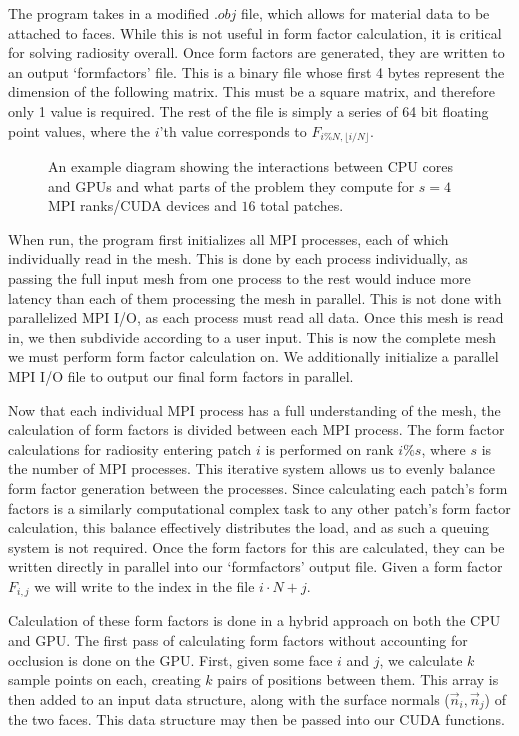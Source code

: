 \documentclass[conference]{IEEEtran}
\begin{document}
The program takes in a modified $.obj$ file, which allows for material data to be attached to faces. While this is not useful in form factor calculation, it is critical for solving radiosity overall. Once form factors are generated, they are written to an output `formfactors' file. This is a binary file whose first 4 bytes represent the dimension of the following matrix. This must be a square matrix, and therefore only 1 value is required. The rest of the file is simply a series of 64 bit floating point values, where the $i$'th value corresponds to $F_{i\%N, \lfloor i/N\rfloor}$.

\begin{figure}

\caption{An example diagram showing the interactions between CPU cores and GPUs and what parts of the problem they compute for $s=4$ MPI ranks/CUDA devices and $16$ total patches.}
\label{fig:division}
\end{figure}

When run, the program first initializes all MPI processes, each of which individually read in the mesh. This is done by each process individually, as passing the full input mesh from one process to the rest would induce more latency than each of them processing the mesh in parallel. This is not done with parallelized MPI I/O, as each process must read all data. Once this mesh is read in, we then subdivide according to a user input. This is now the complete mesh we must perform form factor calculation on. We additionally initialize a parallel MPI I/O file to output our final form factors in parallel.

Now that each individual MPI process has a full understanding of the mesh, the calculation of form factors is divided between each MPI process. The form factor calculations for radiosity entering patch $i$ is performed on rank $i\% s$, where $s$ is the number of MPI processes. This iterative system allows us to evenly balance form factor generation between the processes. Since calculating each patch's form factors is a similarly computational complex task to any other patch's form factor calculation, this balance effectively distributes the load, and as such a queuing system is not required. Once the form factors for this are calculated, they can be written directly in parallel into our `formfactors' output file. Given a form factor $F_{i,j}$ we will write to the index in the file $i\cdot N + j$.

Calculation of these form factors is done in a hybrid approach on both the CPU and GPU. The first pass of calculating form factors without accounting for occlusion is done on the GPU. First, given some face $i$ and $j$, we calculate $k$ sample points on each, creating $k$ pairs of positions between them. This array is then added to an input data structure, along with the surface normals ($\vec{n}_i, \vec{n}_j$) of the two faces. This data structure may then be passed into our CUDA functions.
\end{document}
